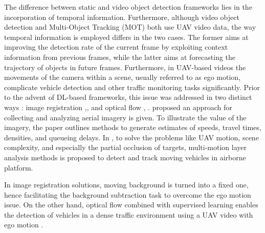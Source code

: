 \documentclass[10pt,twocolumn,letterpaper]{article}  %
\begin{document}
The difference between static and video object detection frameworks lies in the incorporation of temporal information. Furthermore, although video object detection and Multi-Object Tracking (MOT) both use UAV video data, the way temporal information is employed differs in the two cases. The former aims at improving the detection rate of the current frame by exploiting context information from previous frames, while the latter aims at forecasting the trajectory of objects in future frames. Furthermore, in UAV-based videos the movements of the camera within a scene, usually referred to as ego motion, complicate vehicle detection and other traffic monitoring tasks significantly. Prior to the advent of DL-based frameworks, this issue was addressed in two distinct ways \cite{bisio2022systematic}: image registration \cite{yalcin2005flow},\cite{angel2003methods},\cite{cao2012vehicle} and optical flow \cite{cao2012vehicle} \cite{yalcin2005flow}, \cite{ke2016real}. \cite{angel2003methods} proposed an approach for collecting and analyzing aerial imagery is given. To illustrate the value of the imagery, the paper outlines methods to generate estimates of speeds, travel times, densities, and queueing delays. In \cite{cao2012vehicle}, to solve the problems like UAV motion, scene complexity, and especially the partial occlusion of targets, multi-motion layer analysis methods is proposed to detect and track moving vehicles in airborne platform. 

In image registration solutions, moving background is turned into a fixed one, hence facilitating the background subtraction task \cite{zhou2007moving} to overcome the ego motion issue. On the other hand, optical flow combined with supervised learning enables the detection of vehicles in a dense traffic environment using a UAV video with ego motion \cite{bisio2022systematic}.
\end{document}
